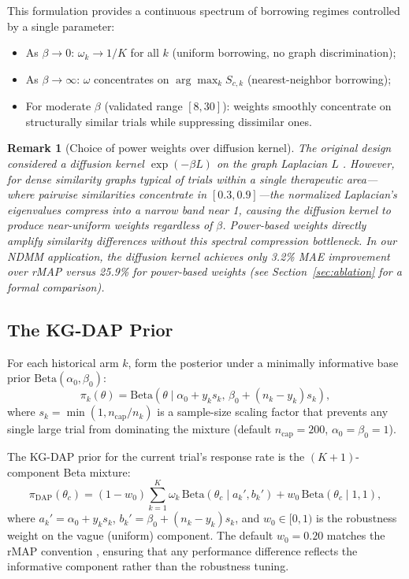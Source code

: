 \documentclass[12pt]{article}
\newtheorem{remark}{Remark}
\newcommand{\thetac}{\theta_c}
\newcommand{\piDAP}{\pi_{\mathrm{DAP}}}
\begin{document}
This formulation provides a continuous spectrum of borrowing regimes controlled by a single parameter:
\begin{itemize}
    \item As $\beta \to 0$: $\omega_k \to 1/K$ for all $k$ (uniform borrowing, no graph discrimination);
    \item As $\beta \to \infty$: $\omega$ concentrates on $\arg\max_k S_{c,k}$ (nearest-neighbor borrowing);
    \item For moderate $\beta$ (validated range $[8, 30]$): weights smoothly concentrate on structurally similar trials while suppressing dissimilar ones.
\end{itemize}

\begin{remark}[Choice of power weights over diffusion kernel]
\label{rem:power_vs_diffusion}
The original design considered a diffusion kernel $\exp(-\beta L)$ on the graph Laplacian $L$ \citep{kondor2002diffusion, smola2003kernels}. However, for dense similarity graphs typical of trials within a single therapeutic area---where pairwise similarities concentrate in $[0.3, 0.9]$---the normalized Laplacian's eigenvalues compress into a narrow band near 1, causing the diffusion kernel to produce near-uniform weights regardless of $\beta$. Power-based weights directly amplify similarity differences without this spectral compression bottleneck. In our NDMM application, the diffusion kernel achieves only 3.2\% MAE improvement over rMAP versus 25.9\% for power-based weights (see Section~\ref{sec:ablation} for a formal comparison).
\end{remark}

\subsection{The KG-DAP Prior}
\label{sec:prior}

For each historical arm $k$, form the posterior under a minimally informative base prior $\mathrm{Beta}(\alpha_0, \beta_0)$:
\begin{equation}
\pi_k(\theta) = \mathrm{Beta}(\theta \mid \alpha_0 + y_k s_k, \, \beta_0 + (n_k - y_k) s_k),
\label{eq:hist_component}
\end{equation}
where $s_k = \min(1, n_{\mathrm{cap}} / n_k)$ is a sample-size scaling factor that prevents any single large trial from dominating the mixture (default $n_{\mathrm{cap}} = 200$, $\alpha_0 = \beta_0 = 1$).

The KG-DAP prior for the current trial's response rate is the $(K+1)$-component Beta mixture:
\begin{equation}
\piDAP(\thetac) = (1 - w_0) \sum_{k=1}^{K} \omega_k \, \mathrm{Beta}(\thetac \mid a_k', b_k') + w_0 \, \mathrm{Beta}(\thetac \mid 1, 1),
\label{eq:kgdap_prior}
\end{equation}
where $a_k' = \alpha_0 + y_k s_k$, $b_k' = \beta_0 + (n_k - y_k) s_k$, and $w_0 \in [0, 1)$ is the robustness weight on the vague (uniform) component. The default $w_0 = 0.20$ matches the rMAP convention \citep{schmidli2014robust}, ensuring that any performance difference reflects the informative component rather than the robustness tuning.
\end{document}
